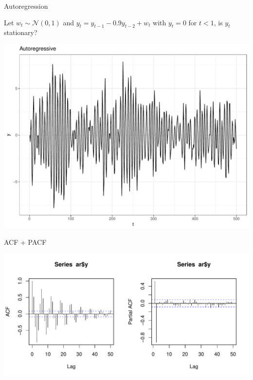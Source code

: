 \documentclass[11pt,ignorenonframetext,]{beamer}
\begin{document}
\begin{frame}{Autoregression}

Let \(w_t \sim \mathcal{N}(0,1)\) and
\(y_t = y_{t-1} - 0.9 y_{t-2} + w_t\) with \(y_t = 0\) for \(t < 1\), is
\(y_t\) stationary?

\includegraphics{Lec6_files/figure-beamer/unnamed-chunk-7-1.pdf}

\end{frame}

\begin{frame}{ACF + PACF}

\includegraphics{Lec6_files/figure-beamer/unnamed-chunk-8-1.pdf}

\end{frame}
\end{document}

